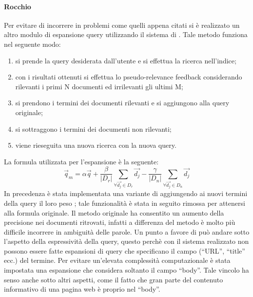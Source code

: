 \paragraph{Rocchio}
Per evitare di incorrere in problemi come quelli appena citati si è realizzato un altro modulo di espansione query utilizzando il sistema di . Tale metodo funziona nel seguente modo:
\begin{enumerate}
\item si prende la query desiderata dall'utente e si effettua la ricerca nell'indice;
\item con i risultati ottenuti si effettua lo pseudo-relevance feedback considerando rilevanti i primi N documenti ed irrilevanti gli ultimi M;
\item si prendono i termini dei documenti rilevanti e si aggiungono alla query originale;
\item si sottraggono i termini dei documenti non rilevanti;
\item viene rieseguita una nuova ricerca con la nuova query.
\end{enumerate}
La formula utilizzata per l'espansione è la seguente:
$$
\overrightarrow{q}_{m} = \alpha\overrightarrow{q} + \dfrac{\beta}{\vert D_{r}\vert}\sum_{\forall\overrightarrow{d_{j}}\in D_{r}}\overrightarrow{d_{j}} - \dfrac{\gamma}{\vert D_{n}\vert}\sum_{\forall\overrightarrow{d_{j}}\in D_{n}}\overrightarrow{d_{j}}
$$
In precedenza è stata implementata una variante di  aggiungendo ai nuovi termini della query il loro peso ; tale funzionalità è stata in seguito rimossa per attenersi alla formula originale.
Il metodo originale ha consentito un aumento della precisione nei documenti ritrovati, infatti a differenza del metodo  è molto più difficile incorrere in ambiguità delle parole. Un punto a favore di  può andare sotto l'aspetto della espressività della query, questo perchè con il sistema  realizzato non possono essere fatte espansioni di query che specificano il campo (``URL'', ``title'' ecc.) del termine. Per evitare un'elevata complessità computazionale è stata impostata una espansione che considera soltanto il campo ``body''. Tale vincolo ha senso anche sotto altri aspetti, come il fatto che gran parte del contenuto informativo di una pagina web è proprio nel ``body''.